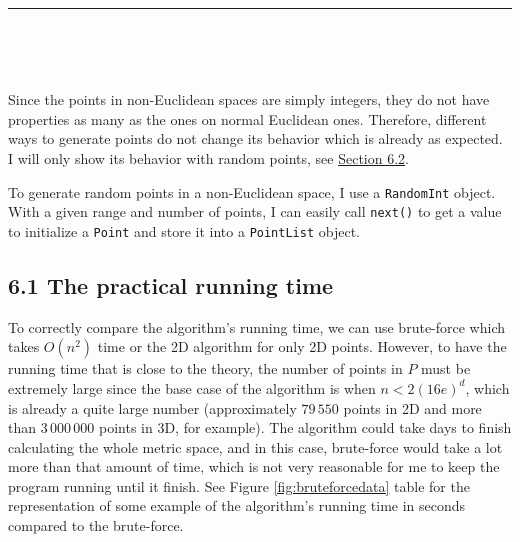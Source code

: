 \documentclass[12pt,english,]{article}
\newcommand{\code}[1]{\colorbox{light-gray}{\texttt{#1}}}
\let\origfigure\figure
\let\endorigfigure\endfigure
\renewenvironment{figure}[1][2] {
    \expandafter\origfigure\expandafter[H]
} {
    \endorigfigure
}
\begin{document}
\vspace{-2truemm}
\begin{figure}[!h]
\centering
{}

\caption{An example of points in a grid on a Euclidean space. A set of 40 points that gives us a $4\times10$ grid. Points are placed at corners of the squares whose sides are equal to $d$ that could be any number.}
\label{fig:grid}
\end{figure}

\hrule

~

~

Since the points in non-Euclidean spaces are simply integers, they do
not have properties as many as the ones on normal Euclidean ones.
Therefore, different ways to generate points do not change its behavior
which is already as expected. I will only show its behavior with random
points, see \protect\hyperlink{section6.2}{Section 6.2}.

To generate random points in a non-Euclidean space, I use a
\code{RandomInt} object. With a given range and number of points, I can
easily call \code{next()} to get a value to initialize a \code{Point}
and store it into a \code{PointList} object.

\hypertarget{the-practical-running-time}{%
\subsection{6.1 The practical running
time}\label{the-practical-running-time}}

To correctly compare the algorithm's running time, we can use
brute-force which takes \(O(n^2)\) time or the 2D algorithm for only 2D
points. However, to have the running time that is close to the theory,
the number of points in \(P\) must be extremely large since the base
case of the algorithm is when \(n < 2(16e)^d\), which is already a quite
large number (approximately \(79\,550\) points in 2D and more than
\(3\,000\,000\) points in 3D, for example). The algorithm could take
days to finish calculating the whole metric space, and in this case,
brute-force would take a lot more than that amount of time, which is not
very reasonable for me to keep the program running until it finish. See
Figure \ref{fig:bruteforcedata} table for the representation of some
example of the algorithm's running time in seconds compared to the
brute-force.
\end{document}
